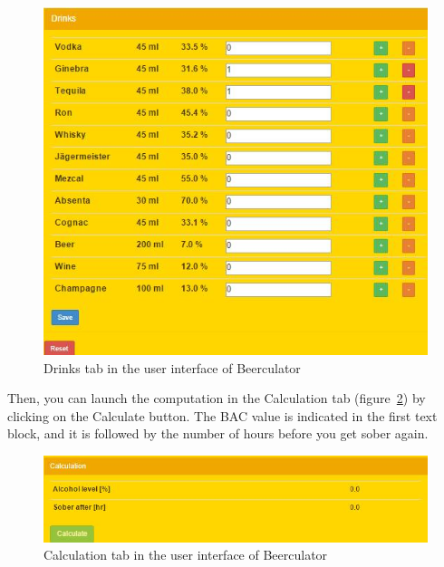 \begin{figure}[H]
	\centering
   \includegraphics[scale=0.65]{./figures/drinks_tab.jpg}
   \caption{Drinks tab in the user interface of Beerculator}
   \label{fig:drinks}
\end{figure}

Then, you can launch the computation in the \guillemotleft{} Calculation \guillemotright{} tab ({\sc figure}~\ref{fig:calcul}) by clicking on the \guillemotleft{} Calculate \guillemotright{} button. The BAC value is indicated in the first text block, and it is followed by the number of hours before you get sober again.

\begin{figure}[H]
	\centering
   \includegraphics[scale=0.65]{./figures/calcul.jpg}
   \caption{Calculation tab in the user interface of Beerculator}
   \label{fig:calcul}
\end{figure}